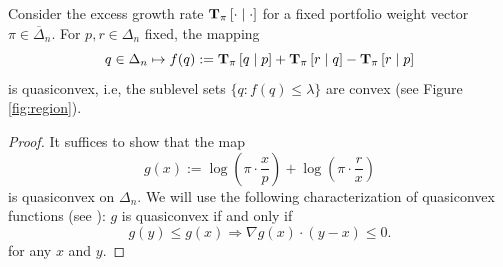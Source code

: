 \documentclass[graybox]{svmult}
\begin{document}
\begin{proposition}
Consider the excess growth rate ${\bf T}_{\pi}\left[ \cdot \mid \cdot\right]$ for a fixed portfolio weight vector $\pi \in \overline{\Delta}_n$. For $p, r \in \Delta_n$ fixed, the mapping
\begin{equation} \label{eqn:region}
q \in \Delta_n \mapsto f(q) := {\bf T}_{\pi}\left[q \mid p\right] + {\bf T}_{\pi}\left[r \mid q\right] - {\bf T}_{\pi}\left[r \mid p\right]
\end{equation}
is quasiconvex, i.e, the sublevel sets $\{q : f(q) \leq \lambda\}$ are convex (see Figure \ref{fig:region}). 
\end{proposition}
\begin{proof}
It suffices to show that the map
\[
g(x) := \log \left( \pi \cdot \frac{x}{p}\right) + \log \left( \pi \cdot \frac{r}{x}\right)
\]
is quasiconvex on $\Delta_n$. We will use the following characterization of quasiconvex functions (see \cite[Section 3.4.3]{BV04}): $g$ is quasiconvex if and only if
\begin{equation} \label{eqn:quasiconvex}
g(y) \leq g(x) \Rightarrow \nabla g(x) \cdot (y - x) \leq 0.
\end{equation}
for any $x$ and $y$.


\end{proof}
\end{document}
